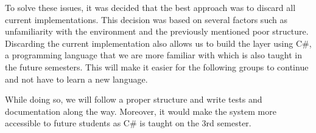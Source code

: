 To solve these issues, it was decided that the best approach was to discard all current implementations. 
This decision was based on several factors such as unfamiliarity with the environment and the previously mentioned poor structure. 
Discarding the current implementation also allows us to build the layer using C\#, a programming language that we are more familiar with which is also taught in the future semesters. 
This will make it easier for the following groups to continue and not have to learn a new language.

While doing so, we will follow a proper structure and write tests and documentation along the way. 
Moreover, it would make the system more accessible to future students as C\# is taught on the 3rd semester.